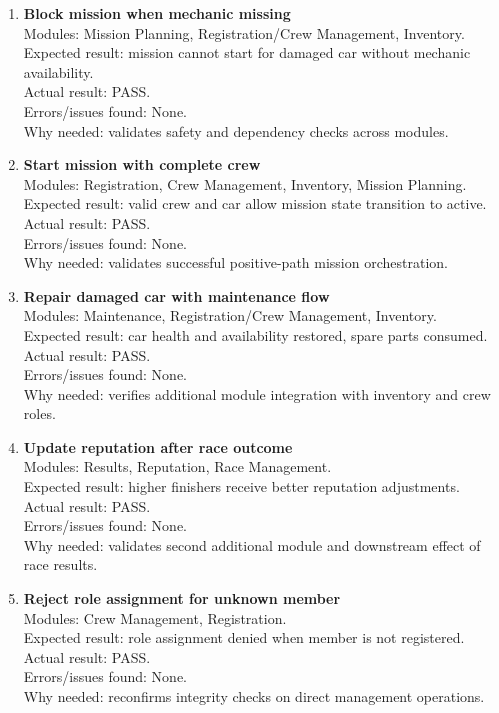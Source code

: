 \documentclass[11pt,a4paper]{article}
\begin{document}
\begin{enumerate}
\item \textbf{Block mission when mechanic missing}\\
Modules: Mission Planning, Registration/Crew Management, Inventory.\\
Expected result: mission cannot start for damaged car without mechanic availability.\\
Actual result: PASS.\\
Errors/issues found: None.\\
Why needed: validates safety and dependency checks across modules.

\item \textbf{Start mission with complete crew}\\
Modules: Registration, Crew Management, Inventory, Mission Planning.\\
Expected result: valid crew and car allow mission state transition to active.\\
Actual result: PASS.\\
Errors/issues found: None.\\
Why needed: validates successful positive-path mission orchestration.

\item \textbf{Repair damaged car with maintenance flow}\\
Modules: Maintenance, Registration/Crew Management, Inventory.\\
Expected result: car health and availability restored, spare parts consumed.\\
Actual result: PASS.\\
Errors/issues found: None.\\
Why needed: verifies additional module integration with inventory and crew roles.

\item \textbf{Update reputation after race outcome}\\
Modules: Results, Reputation, Race Management.\\
Expected result: higher finishers receive better reputation adjustments.\\
Actual result: PASS.\\
Errors/issues found: None.\\
Why needed: validates second additional module and downstream effect of race results.

\item \textbf{Reject role assignment for unknown member}\\
Modules: Crew Management, Registration.\\
Expected result: role assignment denied when member is not registered.\\
Actual result: PASS.\\
Errors/issues found: None.\\
Why needed: reconfirms integrity checks on direct management operations.
\end{enumerate}
\end{document}
